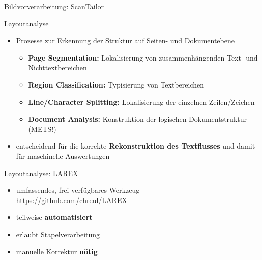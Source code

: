 \documentclass{bbawslides}
\begin{document}
\begin{bbawslide}{Bildvorverarbeitung: ScanTailor}
  \vspace*{2mm}%
  \begin{center}
  \end{center}
\end{bbawslide}

\begin{bbawslide}{Layoutanalyse}
  \vspace*{7mm}%
  \centerslidestrue%
  \begin{itemize}
    \item Prozesse zur Erkennung der Struktur auf Seiten- und Dokumentebene
    \begin{itemize}\small
      \item \textbf{Page Segmentation:} Lokalisierung von zusammenhängenden Text- und Nichttextbereichen
      \item \textbf{Region Classification:} Typisierung von Textbereichen
      \item \textbf{Line/Character Splitting:} Lokalisierung der einzelnen Zeilen/Zeichen
      \item \textbf{Document Analysis:} Konstruktion der logischen Dokumentstruktur (METS!)
    \end{itemize}
    \item entscheidend für die korrekte \textbf{Rekonstruktion des Textflusses} und damit für maschinelle Auswertungen
  \end{itemize}
\end{bbawslide}

\begin{bbawslide}{Layoutanalyse: LAREX}
  \vspace*{7mm}%
  \centerslidestrue%
  \begin{itemize}
    \item umfassendes, frei verfügbares Werkzeug\\
          \url{https://github.com/chreul/LAREX}
   \item teilweise \textbf{automatisiert}
    \item erlaubt Stapelverarbeitung
    \item manuelle Korrektur \textbf{nötig}
  \end{itemize}
\end{bbawslide}
\end{document}
